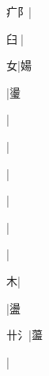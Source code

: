 \begin{multicols}{2}
{{\cjk{}{\cnsym{}　}疒{阝}}|{}\par
{\cjk{}{\cnsym{}　}臼{\cnjzr{}}}|{}\par
{\cjk{}{\cnsym{}　}{\cnsym{}　}女}|{\cjk{}婸}\par
{}|{\cjk{}璗}\par
{}|{}\par
{}|{}\par
{}|{}\par
{\cjk{}{\cnsym{}　}{\cnsym{}　}{\cnsym{}　}}|{}\par
{\cjk{}{\cnsym{}　}{\cnsym{}　}{\cnsym{}　}}|{}\par
{}|{}\par
{\cjk{}{\cnsym{}　}{\cnsym{}　}木}|{}\par
{}|{\cjk{}盪}\par
{\cjk{}{\cnsym{}　}卄{\cnxHanaA{}氵}}|{\cjk{}蘯}\par
{\cjk{}{\cnsym{}　}{\cnsym{}　}{\cnsym{}　}}|{}\par
}
\end{multicols}
